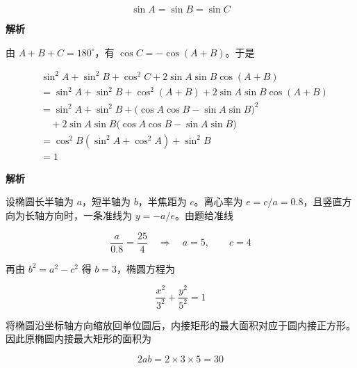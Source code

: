 \begin{answer}
\nopagebreak[4]
\[
\sin A=\sin B=\sin C
\]


\textbf{解析}

由 $A+B+C=180^\circ$，有 $\cos C=-\cos(A+B)$。于是

\nopagebreak[4]
\[
\begin{aligned}
&\sin^2A+\sin^2B+\cos^2C+2\sin A\sin B\cos(A+B)\\
&=\sin^2A+\sin^2B+\cos^2(A+B)+2\sin A\sin B\cos(A+B)\\
&=\sin^2A+\sin^2B+\bigl(\cos A\cos B-\sin A\sin B\bigr)^2\\
&\quad+2\sin A\sin B\bigl(\cos A\cos B-\sin A\sin B\bigr)\\
&=\cos^2B(\sin^2A+\cos^2A)+\sin^2B\\
&=1
\end{aligned}
\]


\textbf{解析}

设椭圆长半轴为 $a$，短半轴为 $b$，半焦距为 $c$。离心率为 $e=c/a=0.8$，且竖直方向为长轴方向时，一条准线为 $y=-a/e$。由题给准线

\nopagebreak[4]
\[
\frac{a}{0.8}=\frac{25}{4}
\quad\Longrightarrow\quad
a=5,\qquad c=4
\]

再由 $b^2=a^2-c^2$ 得 $b=3$，椭圆方程为

\nopagebreak[4]
\[
\frac{x^2}{3^2}+\frac{y^2}{5^2}=1
\]

将椭圆沿坐标轴方向缩放回单位圆后，内接矩形的最大面积对应于圆内接正方形。因此原椭圆内接最大矩形的面积为

\nopagebreak[4]
\[
2ab=2\times3\times5=30
\]



\end{answer}